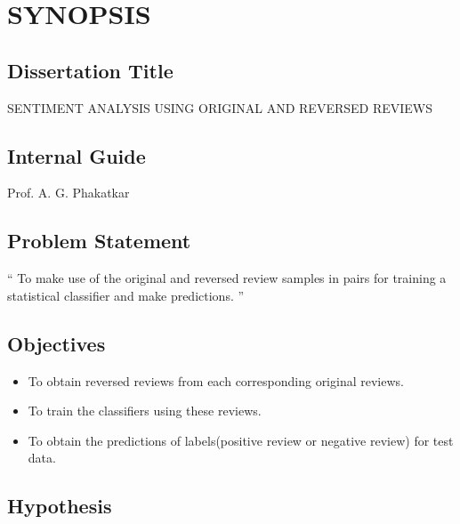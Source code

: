 \documentclass[oneside,a4paper,12pt]{pictreport}
\begin{document}
\setlength{\parindent}{11mm}
\chapter{SYNOPSIS}


\section{Dissertation Title}
SENTIMENT ANALYSIS USING ORIGINAL AND REVERSED REVIEWS



\section{Internal Guide}
Prof. A. G. Phakatkar



\section{Problem Statement}
\label{sec:problem_def}
`` To make use of the original and reversed review samples in pairs for training a
statistical classifier and make predictions. ''

\section{Objectives}
\begin{itemize}
    \item To obtain reversed reviews from each corresponding original reviews.
    \item To train the classifiers  using these reviews.
    \item To obtain the predictions of labels(positive review or negative review) for test data.
\end{itemize}

\section{Hypothesis}
\end{document}
